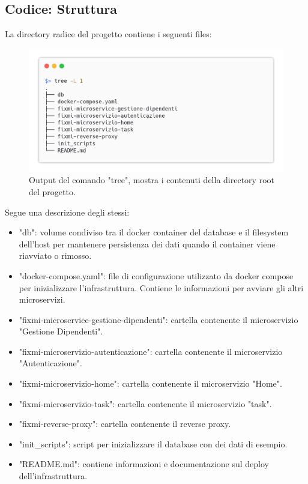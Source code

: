 \documentclass{report}
\begin{document}
\subsection*{Codice: Struttura}

La directory radice del progetto contiene i seguenti files:

\begin{figure}[H]
	\centering\includegraphics[width=1\textwidth]{images/tree.png}
    Output del comando "tree", mostra i contenuti della directory root del progetto.
\end{figure}

Segue una descrizione degli stessi:
\begin{itemize}
	\item "db": volume condiviso tra il docker container del database e il filesystem dell'host per mantenere persistenza dei dati quando il container viene riavviato o rimosso.
	\item "docker-compose.yaml": file di configurazione utilizzato da docker compose per inizializzare l'infrastruttura. Contiene le informazioni per avviare gli altri microservizi.
	\item "fixmi-microservice-gestione-dipendenti": cartella contenente il microservizio "Gestione Dipendenti".
	\item "fixmi-microservizio-autenticazione": cartella contenente il microservizio "Autenticazione".
	\item "fixmi-microservizio-home": cartella contenente il microservizio "Home".
	\item "fixmi-microservizio-task": cartella contenente il microservizio "task".
	\item "fixmi-reverse-proxy": cartella contenente il reverse proxy.
	\item "init\_scripts": script per inizializzare il database con dei dati di esempio.
	\item "README.md": contiene informazioni e documentazione sul deploy dell'infrastruttura.
\end{itemize}
\end{document}
